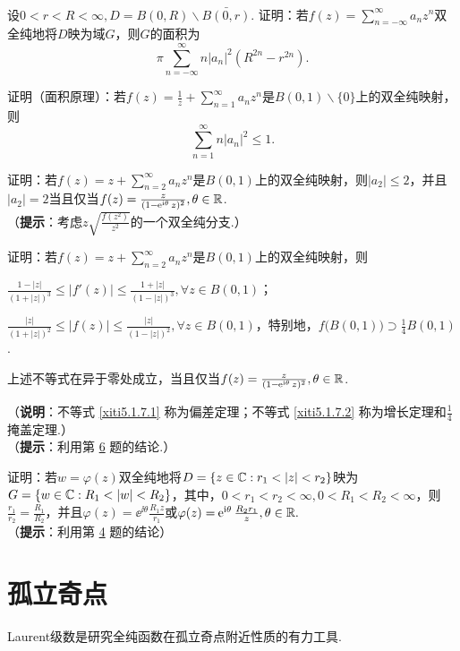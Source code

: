 \begin{xiti}
\begin{align*}
      \end{align*}
  \item \hypertarget{xiti5.1.4}{} 设$0<r<R<\infty,D=B(0,R)\backslash\bar{B(0,r)}$. 证明：若$f(z)=\sum_{n=-\infty}^\infty a_nz^n$双全纯地将$D$映为域$G$，则$G$的面积为
      \[
        \pi\sum_{n=-\infty}^\infty n|a_n|^2(R^{2n}-r^{2n}).
      \]
  \item 证明（面积原理）：若$f(z)=\frac1z+\sum_{n=1}^\infty a_nz^n$是$B(0,1)\backslash\{0\}$上的双全纯映射，则
      \[
        \sum_{n=1}^\infty n |a_n|^2 \le1.
      \]
  \item \hypertarget{xiti5.1.6}{} 证明：若$f(z)=z+\sum_{n=2}^\infty a_nz^n$是$B(0,1)$上的双全纯映射，则$|a_2|\le2$，并且$|a_2|=2$当且仅当$f(z)=\frac z{(1-\operatorname{\!\!\;\mathrm e}^{\mathrm i\theta}z)^2},\theta\in\mathbb R$.\\
     （\textbf{提示}：考虑$z\sqrt{\frac{f(z^2)}{z^2}}$的一个双全纯分支.）
  \item 证明：若$f(z)=z+\sum_{n=2}^\infty a_nz^n$是$B(0,1)$上的双全纯映射，则
      \begin{enuma}
        \item \label{xiti5.1.7.1}$\frac{1-|z|}{(1+|z|)^3}\le|f'(z)|\le\frac{1+|z|}{(1-|z|)^3},\forall z\in B(0,1)$；
        \item \label{xiti5.1.7.2}$\frac{|z|}{(1+|z|)^2}\le|f(z)|\le\frac{|z|}{(1-|z|)^2},\forall z\in B(0,1)$，特别地，$f\big(B(0,1)\big)\supset \frac14B(0,1)$.
        \item 上述不等式在异于零处成立，当且仅当$f(z)=\frac z{(1-\operatorname{\!\!\;\mathrm e}^{\mathrm i\theta}z)^2},\theta\in\mathbb R$.
      \end{enuma}
      （\textbf{说明}：不等式 \ref{xiti5.1.7.1} 称为偏差定理；不等式 \ref{xiti5.1.7.2} 称为增长定理和$\frac14$掩盖定理.）\\
      （\textbf{提示}：利用第 \hyperlink{xiti5.1.6}{6} 题的结论.）
  \item 证明：若$w=\varphi(z)$双全纯地将$D=\{z\in\MC:r_1<|z|<r_2\}$映为$G=\{w\in\MC:
      R_1<|w|<R_2\}$，其中，$0<r_1<r_2<\infty,0<R_1<R_2<\infty$，则$\frac{r_1}{r_2}=\frac{R_1}{R_2}$，并且$\varphi(z)=\ee^{\ii\theta}\frac{R_1z}{r_1}$或$\varphi(z)=\operatorname{\!\!\;\mathrm e}^{\mathrm i\theta}\frac{R_2r_1}z,\theta\in\mathbb R.$\\
      （\textbf{提示}：利用第 \hyperlink{xiti5.1.4}{4} 题的结论）
\end{xiti}

\section{孤立奇点\label{sec5.2}}
Laurent级数是研究全纯函数在孤立奇点附近性质的有力工具.

